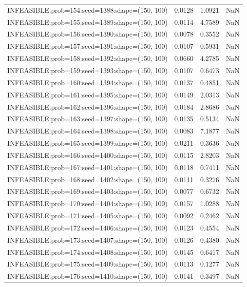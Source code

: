 \begin{longtable}{lccc}
INFEASIBLE:prob=154:seed=1388:shape=(150, 100) & 0.0128 &  1.0921 &    NaN \\
INFEASIBLE:prob=155:seed=1389:shape=(150, 100) & 0.0114 &  4.7589 &    NaN \\
INFEASIBLE:prob=156:seed=1390:shape=(150, 100) & 0.0078 &  0.3552 &    NaN \\
INFEASIBLE:prob=157:seed=1391:shape=(150, 100) & 0.0107 &  0.5931 &    NaN \\
INFEASIBLE:prob=158:seed=1392:shape=(150, 100) & 0.0660 &  4.2785 &    NaN \\
INFEASIBLE:prob=159:seed=1393:shape=(150, 100) & 0.0107 &  0.6473 &    NaN \\
INFEASIBLE:prob=160:seed=1394:shape=(150, 100) & 0.0137 &  0.4851 &    NaN \\
INFEASIBLE:prob=161:seed=1395:shape=(150, 100) & 0.0149 &  2.0313 &    NaN \\
INFEASIBLE:prob=162:seed=1396:shape=(150, 100) & 0.0184 &  2.8686 &    NaN \\
INFEASIBLE:prob=163:seed=1397:shape=(150, 100) & 0.0135 &  0.5134 &    NaN \\
INFEASIBLE:prob=164:seed=1398:shape=(150, 100) & 0.0083 &  7.1877 &    NaN \\
INFEASIBLE:prob=165:seed=1399:shape=(150, 100) & 0.0211 &  0.3636 &    NaN \\
INFEASIBLE:prob=166:seed=1400:shape=(150, 100) & 0.0115 &  2.8203 &    NaN \\
INFEASIBLE:prob=167:seed=1401:shape=(150, 100) & 0.0118 &  0.7411 &    NaN \\
INFEASIBLE:prob=168:seed=1402:shape=(150, 100) & 0.0111 &  0.3276 &    NaN \\
INFEASIBLE:prob=169:seed=1403:shape=(150, 100) & 0.0077 &  0.6732 &    NaN \\
INFEASIBLE:prob=170:seed=1404:shape=(150, 100) & 0.0157 &  1.0288 &    NaN \\
INFEASIBLE:prob=171:seed=1405:shape=(150, 100) & 0.0092 &  0.2462 &    NaN \\
INFEASIBLE:prob=172:seed=1406:shape=(150, 100) & 0.0123 &  0.4554 &    NaN \\
INFEASIBLE:prob=173:seed=1407:shape=(150, 100) & 0.0126 &  0.4380 &    NaN \\
INFEASIBLE:prob=174:seed=1408:shape=(150, 100) & 0.0145 &  0.6417 &    NaN \\
INFEASIBLE:prob=175:seed=1409:shape=(150, 100) & 0.0113 &  0.1277 &    NaN \\
INFEASIBLE:prob=176:seed=1410:shape=(150, 100) & 0.0141 &  0.3497 &    NaN \\

\end{longtable}
